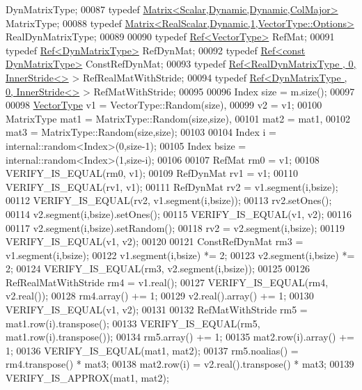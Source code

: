 \begin{DoxyCode}
      DynMatrixType;
00087   \textcolor{keyword}{typedef} \hyperlink{group___core___module_class_eigen_1_1_matrix}{Matrix<Scalar,Dynamic,Dynamic,ColMajor>} MatrixType;
00088   \textcolor{keyword}{typedef} \hyperlink{group___core___module_class_eigen_1_1_matrix}{Matrix<RealScalar,Dynamic,1,VectorType::Options>} 
      RealDynMatrixType;
00089   
00090   \textcolor{keyword}{typedef} \hyperlink{group___core___module_class_eigen_1_1_ref}{Ref<VectorType>} RefMat;
00091   \textcolor{keyword}{typedef} \hyperlink{group___core___module_class_eigen_1_1_ref}{Ref<DynMatrixType>} RefDynMat;
00092   \textcolor{keyword}{typedef} \hyperlink{group___core___module_class_eigen_1_1_ref}{Ref<const DynMatrixType>} ConstRefDynMat;
00093   \textcolor{keyword}{typedef} \hyperlink{group___core___module_class_eigen_1_1_ref}{Ref<RealDynMatrixType , 0, InnerStride<>} > 
      RefRealMatWithStride;
00094   \textcolor{keyword}{typedef} \hyperlink{group___core___module_class_eigen_1_1_ref}{Ref<DynMatrixType , 0, InnerStride<>} > RefMatWithStride;
00095 
00096   Index size = m.size();
00097   
00098   \hyperlink{struct_vector_type}{VectorType}  v1 = VectorType::Random(size),
00099               v2 = v1;
00100   MatrixType mat1 = MatrixType::Random(size,size),
00101              mat2 = mat1,
00102              mat3 = MatrixType::Random(size,size);
00103   
00104   Index i = internal::random<Index>(0,size-1);
00105   Index bsize = internal::random<Index>(1,size-i);
00106   
00107   RefMat rm0 = v1;
00108   VERIFY\_IS\_EQUAL(rm0, v1);
00109   RefDynMat rv1 = v1;
00110   VERIFY\_IS\_EQUAL(rv1, v1);
00111   RefDynMat rv2 = v1.segment(i,bsize);
00112   VERIFY\_IS\_EQUAL(rv2, v1.segment(i,bsize));
00113   rv2.setOnes();
00114   v2.segment(i,bsize).setOnes();
00115   VERIFY\_IS\_EQUAL(v1, v2);
00116   
00117   v2.segment(i,bsize).setRandom();
00118   rv2 = v2.segment(i,bsize);
00119   VERIFY\_IS\_EQUAL(v1, v2);
00120   
00121   ConstRefDynMat rm3 = v1.segment(i,bsize);
00122   v1.segment(i,bsize) *= 2;
00123   v2.segment(i,bsize) *= 2;
00124   VERIFY\_IS\_EQUAL(rm3, v2.segment(i,bsize));
00125   
00126   RefRealMatWithStride rm4 = v1.real();
00127   VERIFY\_IS\_EQUAL(rm4, v2.real());
00128   rm4.array() += 1;
00129   v2.real().array() += 1;
00130   VERIFY\_IS\_EQUAL(v1, v2);
00131   
00132   RefMatWithStride rm5 = mat1.row(i).transpose();
00133   VERIFY\_IS\_EQUAL(rm5, mat1.row(i).transpose());
00134   rm5.array() += 1;
00135   mat2.row(i).array() += 1;
00136   VERIFY\_IS\_EQUAL(mat1, mat2);
00137   rm5.noalias() = rm4.transpose() * mat3;
00138   mat2.row(i) = v2.real().transpose() * mat3;
00139   VERIFY\_IS\_APPROX(mat1, mat2);

\end{DoxyCode}
